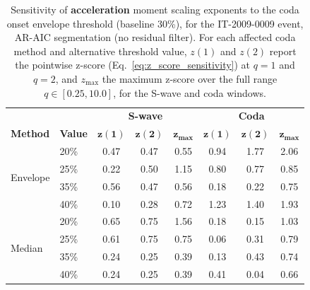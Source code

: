 \begin{table}[htbp]
\centering
\small
\begin{tabular}{llcccccc}
\toprule
& & \multicolumn{3}{c}{\textbf{S-wave}} & \multicolumn{3}{c}{\textbf{Coda}} \\
\textbf{Method} & \textbf{Value} & $\bm{z(1)}$ & $\bm{z(2)}$ & $\bm{z_{\max}}$ & $\bm{z(1)}$ & $\bm{z(2)}$ & $\bm{z_{\max}}$ \\
\midrule
\multirow{4}{*}{Envelope}
& 20\% & 0.47 & 0.47 & 0.55 & 0.94 & 1.77 & 2.06 \\
& 25\% & 0.22 & 0.50 & 1.15 & 0.80 & 0.77 & 0.85 \\
& 35\% & 0.56 & 0.47 & 0.56 & 0.18 & 0.22 & 0.75 \\
& 40\% & 0.10 & 0.28 & 0.72 & 1.23 & 1.40 & 1.93 \\
\midrule
\multirow{4}{*}{Median}
& 20\% & 0.65 & 0.75 & 1.56 & 0.18 & 0.15 & 1.03 \\
& 25\% & 0.61 & 0.75 & 0.75 & 0.06 & 0.31 & 0.79 \\
& 35\% & 0.24 & 0.25 & 0.39 & 0.13 & 0.43 & 0.74 \\
& 40\% & 0.24 & 0.25 & 0.39 & 0.41 & 0.04 & 0.66 \\
\bottomrule
\end{tabular}
\caption{Sensitivity of \textbf{acceleration} moment scaling exponents to the coda onset envelope threshold (baseline 30\%), for the IT-2009-0009 event, AR-AIC segmentation (no residual filter). For each affected coda method and alternative threshold value, $z(1)$ and $z(2)$ report the pointwise z-score (Eq.~\eqref{eq:z_score_sensitivity}) at $q=1$ and $q=2$, and $z_{\max}$ the maximum z-score over the full range $q \in [0.25, 10.0]$, for the S-wave and coda windows.}
\label{tab:coda_threshold_sensitivity_onset_ar_aic_acc_nothresh_laquila}
\end{table}